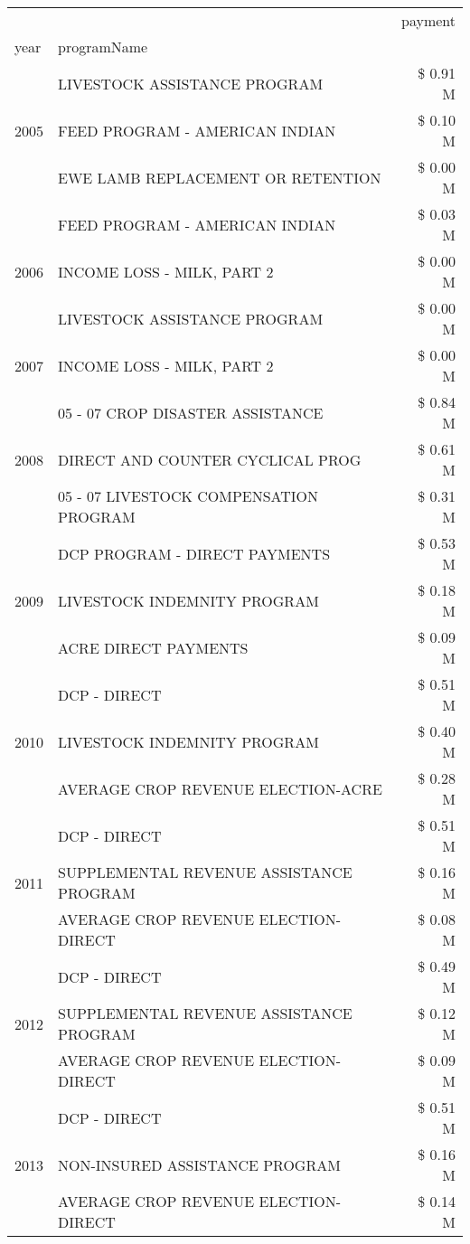 \begin{tabular}{llr}
\toprule
 &  & payment \\
year & programName &  \\
\midrule
\multirow[t]{3}{*}{2005} & LIVESTOCK ASSISTANCE PROGRAM & \$ 0.91 M \\
 & FEED PROGRAM - AMERICAN INDIAN & \$ 0.10 M \\
 & EWE LAMB REPLACEMENT OR RETENTION & \$ 0.00 M \\
\cline{1-3}
\multirow[t]{3}{*}{2006} & FEED PROGRAM - AMERICAN INDIAN & \$ 0.03 M \\
 & INCOME LOSS - MILK, PART 2 & \$ 0.00 M \\
 & LIVESTOCK ASSISTANCE PROGRAM & \$ 0.00 M \\
\cline{1-3}
2007 & INCOME LOSS - MILK, PART 2 & \$ 0.00 M \\
\cline{1-3}
\multirow[t]{3}{*}{2008} & 05 - 07 CROP DISASTER ASSISTANCE & \$ 0.84 M \\
 & DIRECT AND COUNTER CYCLICAL PROG & \$ 0.61 M \\
 & 05 - 07 LIVESTOCK COMPENSATION PROGRAM & \$ 0.31 M \\
\cline{1-3}
\multirow[t]{3}{*}{2009} & DCP PROGRAM - DIRECT PAYMENTS & \$ 0.53 M \\
 & LIVESTOCK INDEMNITY PROGRAM & \$ 0.18 M \\
 & ACRE DIRECT PAYMENTS & \$ 0.09 M \\
\cline{1-3}
\multirow[t]{3}{*}{2010} & DCP - DIRECT & \$ 0.51 M \\
 & LIVESTOCK INDEMNITY PROGRAM & \$ 0.40 M \\
 & AVERAGE CROP REVENUE ELECTION-ACRE & \$ 0.28 M \\
\cline{1-3}
\multirow[t]{3}{*}{2011} & DCP - DIRECT & \$ 0.51 M \\
 & SUPPLEMENTAL REVENUE ASSISTANCE PROGRAM & \$ 0.16 M \\
 & AVERAGE CROP REVENUE ELECTION-DIRECT & \$ 0.08 M \\
\cline{1-3}
\multirow[t]{3}{*}{2012} & DCP - DIRECT & \$ 0.49 M \\
 & SUPPLEMENTAL REVENUE ASSISTANCE PROGRAM & \$ 0.12 M \\
 & AVERAGE CROP REVENUE ELECTION-DIRECT & \$ 0.09 M \\
\cline{1-3}
\multirow[t]{3}{*}{2013} & DCP - DIRECT & \$ 0.51 M \\
 & NON-INSURED ASSISTANCE PROGRAM & \$ 0.16 M \\
 & AVERAGE CROP REVENUE ELECTION-DIRECT & \$ 0.14 M \\

\end{tabular}
